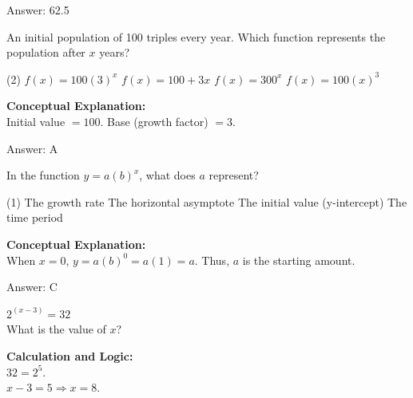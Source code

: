 \documentclass[11pt,paper=a4,answers]{exam}
\begin{document}
\begin{questions}
\begin{solution}
Answer: \colorbox{yellow!100}{62.5}
\end{solution}

\vspace{40pt}

\question
An initial population of 100 triples every year. Which function represents the population after $x$ years?
\begin{tasks}(2)
    \task $f(x) = 100(3)^x$
    \task $f(x) = 100 + 3x$
    \task $f(x) = 300^x$
    \task $f(x) = 100(x)^3$
\end{tasks}

\begin{solution}
\textbf{Conceptual Explanation:} \\
Initial value $= 100$. Base (growth factor) $= 3$.

\vspace{25pt}

Answer: \colorbox{yellow!100}{A}
\end{solution}

\vspace{40pt}

\question
In the function $y = a(b)^x$, what does $a$ represent?
\begin{tasks}(1)
    \task The growth rate
    \task The horizontal asymptote
    \task The initial value (y-intercept)
    \task The time period
\end{tasks}

\begin{solution}
\textbf{Conceptual Explanation:} \\
When $x=0$, $y = a(b)^0 = a(1) = a$. Thus, $a$ is the starting amount.

\vspace{25pt}

Answer: \colorbox{yellow!100}{C}
\end{solution}

\vspace{40pt}

\question
$2^{(x-3)} = 32$ \\
What is the value of $x$?

\begin{solution}
\textbf{Calculation and Logic:} \\
$32 = 2^5$. \\
$x - 3 = 5 \Rightarrow x = 8$.


\end{solution}
\end{questions}
\end{document}
